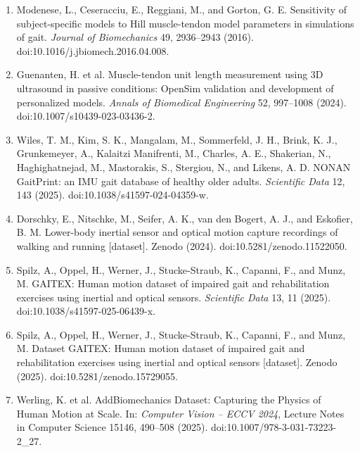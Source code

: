 \documentclass[11pt]{article}
\begin{document}
\begin{enumerate}
\item Modenese, L., Ceseracciu, E., Reggiani, M., and Gorton, G. E. Sensitivity of subject-specific models to Hill muscle-tendon model parameters in simulations of gait. \textit{Journal of Biomechanics} 49, 2936--2943 (2016). doi:10.1016/j.jbiomech.2016.04.008.
\item Guenanten, H. et al. Muscle-tendon unit length measurement using 3D ultrasound in passive conditions: OpenSim validation and development of personalized models. \textit{Annals of Biomedical Engineering} 52, 997--1008 (2024). doi:10.1007/s10439-023-03436-2.
\item Wiles, T. M., Kim, S. K., Mangalam, M., Sommerfeld, J. H., Brink, K. J., Grunkemeyer, A., Kalaitzi Manifrenti, M., Charles, A. E., Shakerian, N., Haghighatnejad, M., Mastorakis, S., Stergiou, N., and Likens, A. D. NONAN GaitPrint: an IMU gait database of healthy older adults. \textit{Scientific Data} 12, 143 (2025). doi:10.1038/s41597-024-04359-w.
\item Dorschky, E., Nitschke, M., Seifer, A. K., van den Bogert, A. J., and Eskofier, B. M. Lower-body inertial sensor and optical motion capture recordings of walking and running [dataset]. Zenodo (2024). doi:10.5281/zenodo.11522050.
\item Spilz, A., Oppel, H., Werner, J., Stucke-Straub, K., Capanni, F., and Munz, M. GAITEX: Human motion dataset of impaired gait and rehabilitation exercises using inertial and optical sensors. \textit{Scientific Data} 13, 11 (2025). doi:10.1038/s41597-025-06439-x.
\item Spilz, A., Oppel, H., Werner, J., Stucke-Straub, K., Capanni, F., and Munz, M. Dataset GAITEX: Human motion dataset of impaired gait and rehabilitation exercises using inertial and optical sensors [dataset]. Zenodo (2025). doi:10.5281/zenodo.15729055.
\item Werling, K. et al. AddBiomechanics Dataset: Capturing the Physics of Human Motion at Scale. In: \textit{Computer Vision -- ECCV 2024}, Lecture Notes in Computer Science 15146, 490--508 (2025). doi:10.1007/978-3-031-73223-2\_27.
\end{enumerate}
\end{document}
